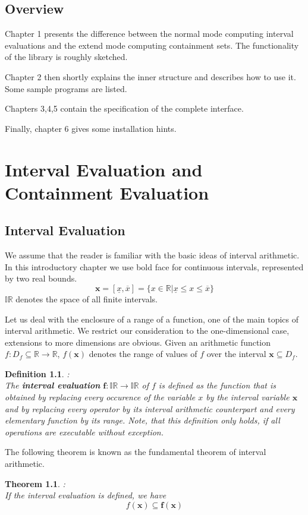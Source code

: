 \documentclass{report}
\newcommand{\R}{\mathbb{R}}
\newcommand{\IR}{\mathbb{IR}}
\newcommand{\xx}{\mathbf{x}}
\newcommand{\ff}{\mathbf{f}}
\newtheorem{defin}{Definition}
\newtheorem{theorem}{Theorem}
\begin{document}
\section*{Overview}
Chapter 1 presents the difference between the normal mode computing interval
evaluations and the extend mode computing containment sets. The functionality
of the library is roughly sketched.

Chapter 2 then shortly explains the inner structure and describes how to use
it. Some sample programs are listed.

Chapters 3,4,5 contain the specification of the complete interface.

Finally, chapter 6 gives some installation hints.

	\chapter{Interval Evaluation and Containment Evaluation}
	\section{Interval Evaluation}	
We assume that the reader is familiar with the basic ideas of interval
arithmetic. In this introductory chapter we use bold face for
continuous intervals, represented by two real bounds.
\[ \xx = [\underline{x},\overline{x}] = \{ x \in \R |\underline{x} \le x \le
\overline{x}\} \] 
$\IR$ denotes the space of all finite intervals.

Let us deal with the enclosure of a range of a function, one of the main topics
of interval arithmetic. We restrict our consideration to the one-dimensional
case, extensions to more dimensions are obvious.
 Given an arithmetic function $f : D_f \subseteq \R \rightarrow \R$,
$f(\xx)$ denotes the range of values of $f$ over the interval $\xx \subseteq
D_f$. 
\begin{defin}:\\  The \textbf{interval evaluation} $\ff: \IR \rightarrow \IR$ of $f$ is defined as the
function that is obtained by replacing every occurence of the variable $x$ by
the interval variable $\xx$ and by replacing every operator by its
interval arithmetic counterpart and every elementary function by 
 its range. Note, that this definition only holds, if all
operations are executable without exception.
\end{defin}


The following theorem is known as the fundamental theorem of interval
arithmetic.
\begin{theorem}:\\
If the interval evaluation is defined, we have
\[ f(\xx) \subseteq \ff(\xx) \]
\end{theorem}
\end{document}

